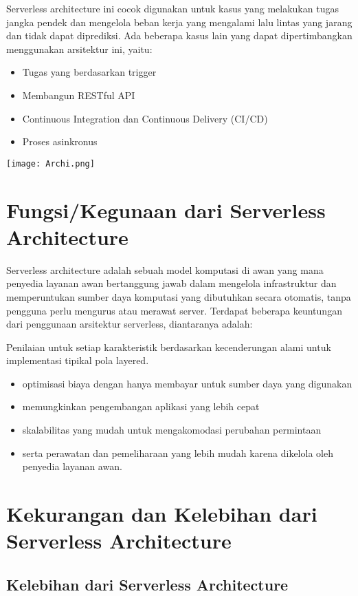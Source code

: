 Serverless architecture ini cocok digunakan untuk kasus yang melakukan tugas jangka pendek dan mengelola beban kerja yang mengalami lalu lintas yang jarang dan tidak dapat diprediksi. Ada beberapa kasus lain yang dapat dipertimbangkan menggunakan arsitektur ini, yaitu:

\begin{itemize}
	\item Tugas yang berdasarkan trigger
	\item Membangun RESTful API
	\item Continuous Integration dan Continuous Delivery (CI/CD)
	\item Proses asinkronus
\end{itemize}

\texttt{[image: Archi.png]}

\section{Fungsi/Kegunaan dari Serverless Architecture}

Serverless architecture adalah sebuah model komputasi di awan yang mana penyedia layanan awan bertanggung jawab dalam mengelola infrastruktur dan memperuntukan sumber daya komputasi yang dibutuhkan secara otomatis, tanpa pengguna perlu mengurus atau merawat server. Terdapat beberapa keuntungan dari penggunaan arsitektur serverless, diantaranya adalah:

Penilaian untuk setiap karakteristik berdasarkan kecenderungan alami untuk implementasi tipikal pola layered.

\begin{itemize}
	\item optimisasi biaya dengan hanya membayar untuk sumber daya yang digunakan
	\item memungkinkan pengembangan aplikasi yang lebih cepat
	\item skalabilitas yang mudah untuk mengakomodasi perubahan permintaan
	\item serta perawatan dan pemeliharaan yang lebih mudah karena dikelola oleh penyedia layanan awan.
\end{itemize}

\section{Kekurangan dan Kelebihan dari Serverless Architecture}
\subsection{Kelebihan dari Serverless Architecture}

